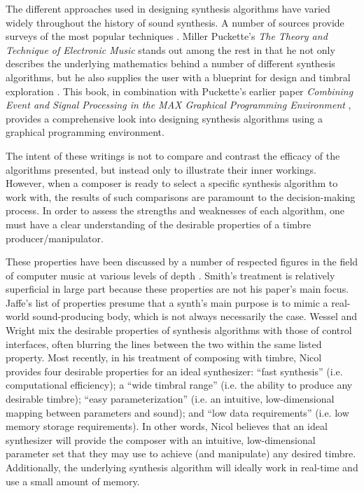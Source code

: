 \documentclass[12pt]{report} 	%
\numberwithin{figure}{chapter}
\numberwithin{table}{chapter}
\numberwithin{equation}{chapter}
\begin{document}
\begin{flushleft}
The different approaches used in designing synthesis algorithms have varied widely throughout the history of sound synthesis. A number of sources provide surveys of the most popular techniques \cite{Roads:NotRead, Miranda:NotRead, Cook:NotRead}. Miller Puckette's \textit{The Theory and Technique of Electronic Music} stands out among the rest in that he not only describes the underlying mathematics behind a number of different synthesis algorithms, but he also supplies the user with a blueprint for design and timbral exploration \cite{Puckette:2007ai}. This book, in combination with Puckette's earlier paper \textit{Combining Event and Signal Processing in the MAX Graphical Programming Environment} \cite{Puckette:NoRead2}, provides a comprehensive look into designing synthesis algorithms using a graphical programming environment. 

The intent of these writings is not to compare and contrast the efficacy of the algorithms presented, but instead only to illustrate their inner workings. However, when a composer is ready to select a specific synthesis algorithm to work with, the results of such comparisons are paramount to the decision-making process. In order to assess the strengths and weaknesses of each algorithm, one must have a clear understanding of the desirable properties of a timbre producer/manipulator.

These properties have been discussed by a number of respected figures in the field of computer music at various levels of depth \cite{III:1991hc, Wessel:2002uk, Jaffe:1995fv}. Smith's treatment is relatively superficial in large part because these properties are not his paper's main focus. Jaffe's list of properties presume that a synth's main purpose is to mimic a real-world sound-producing body, which is not always necessarily the case. Wessel and Wright mix the desirable properties of synthesis algorithms with those of control interfaces, often blurring the lines between the two within the same listed property. Most recently, in his treatment of composing with timbre, Nicol \cite[p. 40]{Nicol:2005rp} provides four desirable properties for an ideal synthesizer: ``fast synthesis'' (i.e. computational efficiency); a ``wide timbral range'' (i.e. the ability to produce any desirable timbre); ``easy parameterization'' (i.e. an intuitive, low-dimensional mapping between parameters and sound); and ``low data requirements'' (i.e. low memory storage requirements). In other words, Nicol believes that an ideal synthesizer will provide the composer with an intuitive, low-dimensional parameter set that they may use to achieve (and manipulate) any desired timbre. Additionally, the underlying synthesis algorithm will ideally work in real-time and use a small amount of memory.


\end{flushleft}
\end{document}

